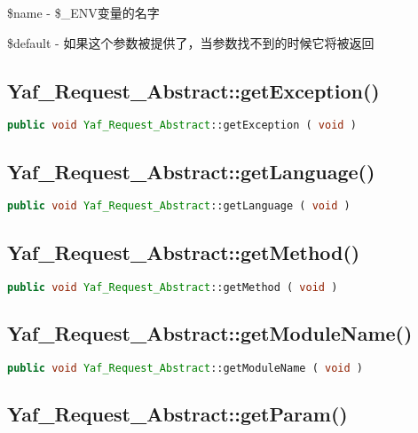\begin{compactitem}
\item \$name - \$\_ENV变量的名字
\item \$default - 如果这个参数被提供了，当参数找不到的时候它将被返回
\end{compactitem}

\subsection{Yaf\_Request\_Abstract::getException()}




\begin{lstlisting}[language=PHP]
public void Yaf_Request_Abstract::getException ( void )
\end{lstlisting}



\subsection{Yaf\_Request\_Abstract::getLanguage()}




\begin{lstlisting}[language=PHP]
public void Yaf_Request_Abstract::getLanguage ( void )
\end{lstlisting}


\subsection{Yaf\_Request\_Abstract::getMethod()}





\begin{lstlisting}[language=PHP]
public void Yaf_Request_Abstract::getMethod ( void )
\end{lstlisting}



\subsection{Yaf\_Request\_Abstract::getModuleName()}




\begin{lstlisting}[language=PHP]
public void Yaf_Request_Abstract::getModuleName ( void )
\end{lstlisting}




\subsection{Yaf\_Request\_Abstract::getParam()}



